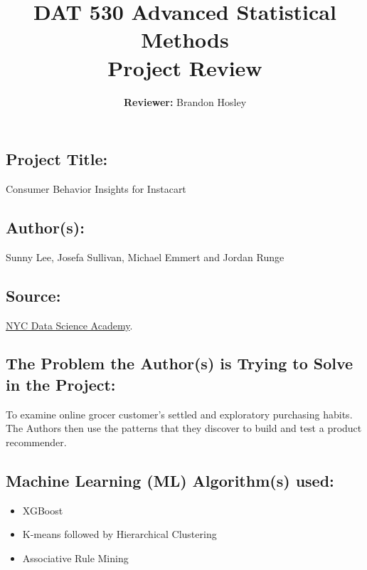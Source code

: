 \documentclass[]{article}
\title{\textbf{DAT 530 Advanced Statistical Methods}\\
	\normalsize{Project Review} }
\author{\textbf{Reviewer: }
	Brandon Hosley}
\begin{document}
\setlength{\droptitle}{-10em} 
\pretitle{\begin{flushleft}\LARGE} %
	\posttitle{\end{flushleft}}
\preauthor{\begin{flushleft}\large} %
	\postauthor{\end{flushleft}}
\predate{\begin{flushleft}\large} %
	\postdate{\end{flushleft}}
\maketitle

\vspace{-2em}

\subsection*{Project Title:}
Consumer Behavior Insights for Instacart

\subsection*{Author(s):}
Sunny Lee, Josefa Sullivan, Michael Emmert and Jordan Runge

\subsection*{Source:}
\href{https://nycdatascience.com/blog/student-works/recommendations-for-online-groceries/}{NYC Data Science Academy}.

\subsection*{The Problem the Author(s) is Trying to Solve in the Project:}
To examine online grocer customer's settled and exploratory purchasing habits. \\
The Authors then use the patterns that they discover to build and test a product recommender.
 
\subsection*{Machine Learning (ML) Algorithm(s) used:}
\begin{itemize}
	\item XGBoost
	\item K-means followed by Hierarchical Clustering
	\item Associative Rule Mining
\end{itemize}
\end{document}
